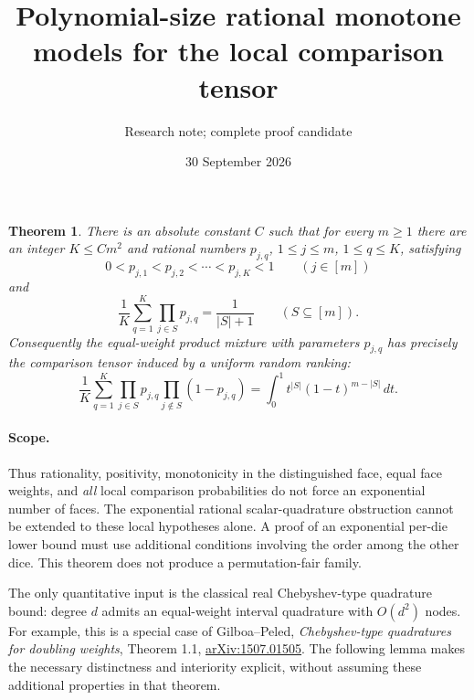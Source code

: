 \documentclass[11pt]{article}
\newtheorem{theorem}{Theorem}
\begin{document}
\title{Polynomial-size rational monotone models for the local comparison tensor}
\author{Research note; complete proof candidate}
\date{30 September 2026}
\maketitle

\begin{theorem}\label{thm:main}
There is an absolute constant $C$ such that for every $m\geq1$ there are
an integer $K\leq Cm^2$ and rational numbers $p_{j,q}$, $1\leq j\leq m$,
$1\leq q\leq K$, satisfying
\[
 0<p_{j,1}<p_{j,2}<\cdots<p_{j,K}<1\qquad(j\in[m])
\]
and
\begin{equation}\label{eq:moments}
 \frac1K\sum_{q=1}^K\prod_{j\in S}p_{j,q}=\frac1{|S|+1}
 \qquad(S\subseteq[m]).
\end{equation}
Consequently the equal-weight product mixture with parameters $p_{j,q}$
has precisely the comparison tensor induced by a uniform random ranking:
\[
 \frac1K\sum_{q=1}^K\prod_{j\in S}p_{j,q}
                         \prod_{j\notin S}(1-p_{j,q})
   =\int_0^1t^{|S|}(1-t)^{m-|S|}\,dt.
\]
\end{theorem}

\paragraph{Scope.}
Thus rationality, positivity, monotonicity in the distinguished face, equal
face weights, and \emph{all} local comparison probabilities do not force
an exponential number of faces. The exponential rational scalar-quadrature
obstruction cannot be extended to these local hypotheses alone. A proof of
an exponential per-die lower bound must use additional conditions involving
the order among the other dice. This theorem does not produce a
permutation-fair family.

The only quantitative input is the classical real Chebyshev-type quadrature
bound: degree $d$ admits an equal-weight interval quadrature with $O(d^2)$
nodes. For example, this is a special case of Gilboa--Peled,
\emph{Chebyshev-type quadratures for doubling weights}, Theorem 1.1,
\href{https://arxiv.org/abs/1507.01505}{arXiv:1507.01505}.
The following lemma makes the necessary distinctness and interiority
explicit, without assuming these additional properties in that theorem.
\end{document}
